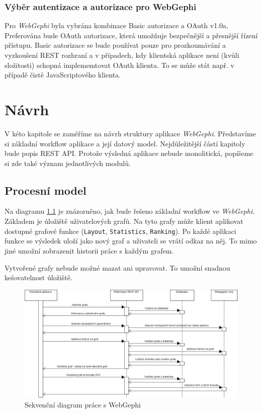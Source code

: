 \documentclass[thesis=M,czech]{FITthesis}[2014/05/6]
\begin{document}
\subsection{Výběr autentizace a autorizace pro WebGephi}
Pro \textit{WebGephi} byla vybrána kombinace Basic autorizace a OAuth v1.0a. Preferována bude OAuth autorizace, která umožňuje bezpečnější a přesnější řízení přístupu.
Basic autorizace se bude používat pouze pro prozkoumávání a vyzkoušení REST rozhraní a v případech, kdy klientská aplikace není (kvůli složitosti) schopná implememtovat OAuth klienta.
To se může stát např. v případě čistě JavaScriptového klienta.

\chapter{Návrh}
V kéto kapitole se zaměříme na návrh struktury aplikace \textit{WebGephi}. Představíme si základní workflow aplikace a její datový model.
Nejdůležitější částí kapitoly bude popis REST API. Protože výsledná aplikace nebude monolitická, popíšeme si zde také význam jednotlivých 
modulů.

\section{Procesní model}

Na diagramu \ref{fig:webgephi-workflow} je znázorněno, jak bude řešeno základní workflow ve \textit{WebGephi}. Základem je úložiště uživatelových 
grafů. Na tyto grafy může klient aplikovat dostupné grafové funkce (\texttt{Layout}, \texttt{Statistics}, \texttt{Ranking}). Po každé aplikaci funkce
se výsledek uloží jako nový graf a uživateli se vrátí odkaz na něj. To mimo jiné umožní zobrazenit historii práce s každým grafem.

Vytvořené grafy nebude možné mazat ani upravovat. To umožní snadnou kešovatelnost úložiště. 

\begin{figure}\centering
 	\includegraphics[width=1\textwidth]{images/diagram/webgephi_workflow}
 	\caption[Sekvenční diagram práce s WebGephi]{Sekvenční diagram práce s WebGephi}\label{fig:webgephi-workflow}
\end{figure}
\end{document}
